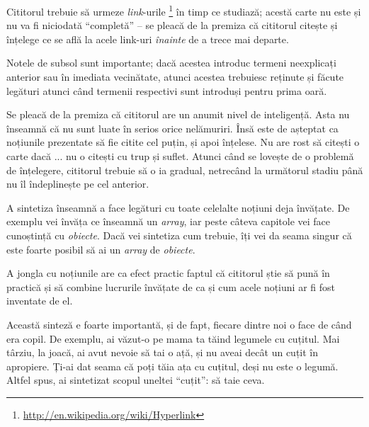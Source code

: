 Cititorul trebuie să urmeze
\textsl{link}-urile
%
%
\footnote{\url{http://en.wikipedia.org/wiki/Hyperlink}} în timp ce
studiază; acestă carte nu este și nu va fi niciodată ``completă'' -- se pleacă
de la premiza că cititorul citește și înțelege ce se află la acele link-uri
\textit{înainte} de a trece mai departe.

Notele de subsol sunt importante; dacă acestea introduc termeni neexplicați
anterior sau în imediata vecinătate, atunci acestea trebuiesc reținute și
făcute legături atunci când termenii respectivi sunt introduși pentru prima
oară.

Se pleacă de la premiza că cititorul are un anumit nivel de inteligență. Asta
nu înseamnă că nu sunt luate în serios orice nelămuriri. Însă este de așteptat
ca noțiunile prezentate să fie citite cel puțin, și apoi înțelese. Nu are rost
să citești o carte dacă ... nu o citești cu trup și suflet. Atunci când se
lovește de o problemă de înțelegere, cititorul trebuie să o ia gradual,
netrecând la următorul stadiu până nu îl îndeplinește pe cel anterior.



A sintetiza înseamnă a face legături cu toate celelalte noțiuni
deja învățate. De exemplu vei învăța ce înseamnă un \textit{array}, iar peste
câteva capitole vei face cunoștință cu \textit{obiecte}. Dacă vei sintetiza
cum trebuie, îți vei da seama singur că este foarte posibil
să ai un \textit{array} de \textit{obiecte}.

A jongla cu noțiunile are ca efect practic faptul că cititorul știe
să pună în practică și să combine lucrurile învățate de ca și cum
acele noțiuni ar fi fost inventate de el.


Această sinteză e foarte importantă, și de fapt, fiecare dintre noi o face de când era
copil. De exemplu, ai văzut-o pe mama ta tăind legumele cu cuțitul.
Mai târziu, la joacă, ai avut nevoie să tai o ață, și nu aveai decât
un cuțit în apropiere. Ți-ai dat seama că poți tăia ața cu cuțitul,
deși nu este o legumă. Altfel spus, ai sintetizat scopul uneltei
``cuțit'': să taie ceva.

